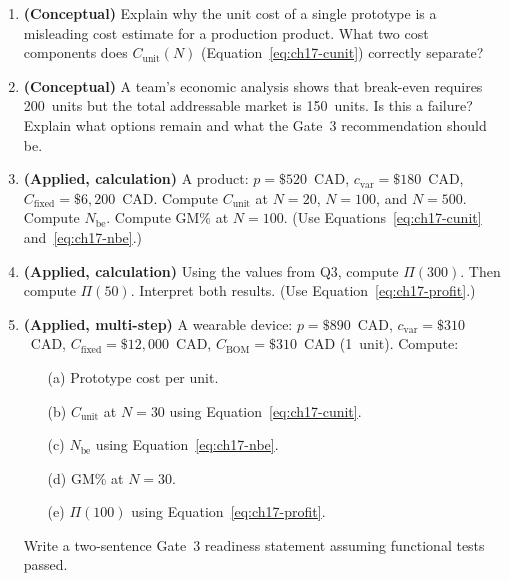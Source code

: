 \begin{enumerate}
  \item \textbf{(Conceptual)} Explain why the unit cost of a single prototype
        is a misleading cost estimate for a production product.
        What two cost components does $C_{\text{unit}}(N)$
        (Equation~\ref{eq:ch17-cunit}) correctly separate?

  \item \textbf{(Conceptual)} A team's economic analysis shows that
        break-even requires 200~units but the total addressable market is
        150~units.
        Is this a failure?
        Explain what options remain and what the Gate~3 recommendation
        should be.

  \item \textbf{(Applied, calculation)} A product: $p = \$520$~CAD,
        $c_{\text{var}} = \$180$~CAD, $C_{\text{fixed}} = \$6{,}200$~CAD.
        Compute $C_{\text{unit}}$ at $N = 20$, $N = 100$, and $N = 500$.
        Compute $N_{\text{be}}$.
        Compute GM\% at $N = 100$.
        (Use Equations~\ref{eq:ch17-cunit} and~\ref{eq:ch17-nbe}.)

  \item \textbf{(Applied, calculation)} Using the values from Q3, compute
        $\Pi(300)$.
        Then compute $\Pi(50)$.
        Interpret both results.
        (Use Equation~\ref{eq:ch17-profit}.)

  \item \textbf{(Applied, multi-step)} A wearable device:
        $p = \$890$~CAD, $c_{\text{var}} = \$310$~CAD,
        $C_{\text{fixed}} = \$12{,}000$~CAD, $C_{\text{BOM}} = \$310$~CAD
        (1~unit).
        Compute:
        \begin{enumerate}
          \item[(a)] Prototype cost per unit.
          \item[(b)] $C_{\text{unit}}$ at $N = 30$ using
                Equation~\ref{eq:ch17-cunit}.
          \item[(c)] $N_{\text{be}}$ using Equation~\ref{eq:ch17-nbe}.
          \item[(d)] GM\% at $N = 30$.
          \item[(e)] $\Pi(100)$ using Equation~\ref{eq:ch17-profit}.
        \end{enumerate}
        Write a two-sentence Gate~3 readiness statement assuming functional
        tests passed.
\end{enumerate}

